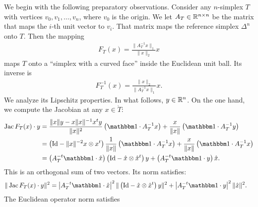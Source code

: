\documentclass[a4paper]{article}
\begin{document}
        \item 
        We begin with the following preparatory observations. 
        Consider any $n$-simplex $T$ with vertices $v_0, v_1, \dots, v_n$, where $v_0$ is the origin. 
        We let $A_{T} \in {\mathbb R}^{n \times n}$ be the matrix that maps the $i$-th unit vector to $v_i$.
        That matrix maps the reference simplex $\Delta^{n}$ onto $T$. 
        Then the mapping 
        \begin{align}
            F_T(x) 
            = 
            \frac{ \| A_{T}^{-1} x \|_{1} }{ \|x\|_2 } x
        \end{align}
        maps $T$ onto a ``simplex with a curved face'' inside the Euclidean unit ball. Its inverse is
        \begin{align}
            F_T^{-1}(x) 
            = 
            \frac{ \|x\|_2 }{ \| A_{T}^{-1} x \|_{1} } x
            .
        \end{align}
        We analyze its Lipschitz properties.
        In what follows, $y \in {\mathbb R}^{n}$. 
        On the one hand, 
        we compute the Jacobian at any $x \in \mathring T$:
        \begin{align*}
            \Jacobian F_T(x) \cdot y
            &= 
            \frac{ \|x\| y - x \|x\|^{-1} x^t y }{\|x\|^2} 
            \left( \vecone \cdot A_{T}^{-1} x \right)
            + 
            \frac{x}{\|x\|} \left( \vecone \cdot A_{T}^{-1} y \right)
            \\&= 
            \left( \Id - \|x\|^{-2} x \otimes x^t \right)
            \frac{ 1 }{ \|x\| } 
            \left( \vecone \cdot A_{T}^{-1} x \right)
            + 
            \frac{x}{\|x\|} \left( \vecone \cdot A_{T}^{-1} x \right)
            \\&= 
            \left( A_{T}^{-t} \vecone \cdot \hat x \right)
            \left( \Id - \hat x \otimes \hat x^t \right) y
            + 
            \left( A_{T}^{-t} \vecone \cdot y \right) \hat x 
            .
        \end{align*}
        This is an orthogonal sum of two vectors. Its norm satisfies:
        \begin{align*}
            \| \Jacobian F_T(x) \cdot y \|^{2}
            &= 
            \left| A_{T}^{-t} \vecone \cdot \hat x \right|^{2}
            \| \left( \Id - \hat x \otimes \hat x^t \right) y \|^{2}
            + 
            \left| A_{T}^{-t} \vecone \cdot y \right|^{2} \| \hat x \|^{2}
            .
        \end{align*}
        The Euclidean operator norm satisfies 
\end{document}
